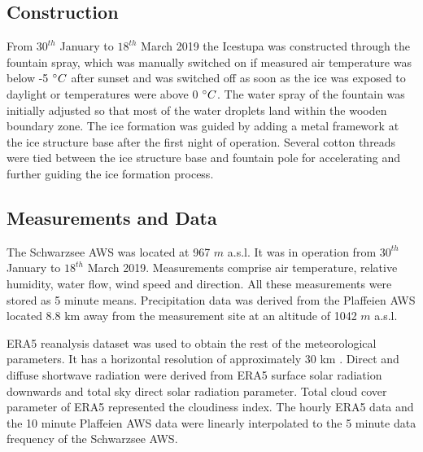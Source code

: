 \documentclass[utf8]{frontiersSCNS} %
\begin{document}
\subsection{Construction} 
From $30^{th}$ January to $18^{th}$ March 2019 the Icestupa was constructed through the fountain spray, which was
manually switched on if measured air temperature was below -5 $\degree C$ after sunset and was switched off as soon as
the ice was exposed to daylight or temperatures were above 0 $\degree C$. The water spray of the fountain was initially
adjusted so that most of the water droplets land within the wooden boundary zone. The ice formation was guided by
adding a metal framework at the ice structure base after the first night of operation.  Several cotton threads were
tied between the ice structure base and fountain pole for accelerating and further guiding the ice formation process. 

\subsection{Measurements and Data}
The Schwarzsee AWS was located at 967 $m$ a.s.l. It was in operation from $30^{th}$  January to $18^{th}$ March 2019.
Measurements comprise air temperature, relative humidity, water flow, wind speed and direction. All these measurements
were stored as 5 minute means. Precipitation data was derived from the Plaffeien AWS \citep{meteoswiss} located 8.8 km
away from the measurement site at an altitude of 1042 $m$ a.s.l.  


ERA5 reanalysis dataset \citep{era5} was used to obtain the rest of the meteorological parameters. It has a horizontal
resolution of approximately 30 km \citep{ERA5_2020}. Direct and diffuse shortwave radiation were derived from ERA5
surface solar radiation downwards and total sky direct solar radiation parameter. Total cloud cover parameter of ERA5
represented the cloudiness index.  The hourly ERA5 data and the 10 minute Plaffeien AWS data were linearly interpolated
to the 5 minute data frequency of the Schwarzsee AWS. 
\end{document}
